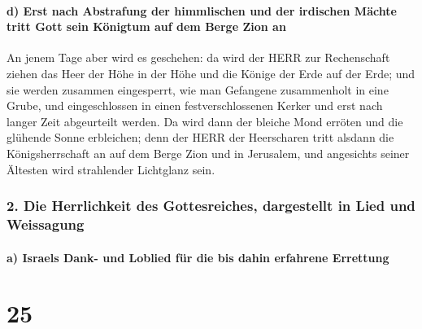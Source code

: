 \hypertarget{d-erst-nach-abstrafung-der-himmlischen-und-der-irdischen-muxe4chte-tritt-gott-sein-kuxf6nigtum-auf-dem-berge-zion-an}{%
\paragraph{d) Erst nach Abstrafung der himmlischen und der irdischen
Mächte tritt Gott sein Königtum auf dem Berge Zion
an}\label{d-erst-nach-abstrafung-der-himmlischen-und-der-irdischen-muxe4chte-tritt-gott-sein-kuxf6nigtum-auf-dem-berge-zion-an}}

An jenem Tage aber wird es geschehen: da wird der HERR
zur Rechenschaft ziehen das Heer der Höhe in der Höhe und die Könige der
Erde auf der Erde; und sie werden zusammen eingesperrt,
wie man Gefangene zusammenholt in eine Grube, und eingeschlossen in
einen festverschlossenen Kerker und erst nach langer Zeit abgeurteilt
werden. Da wird dann der bleiche Mond erröten und die
glühende Sonne erbleichen; denn der HERR der Heerscharen tritt alsdann
die Königsherrschaft an auf dem Berge Zion und in Jerusalem, und
angesichts seiner Ältesten wird strahlender Lichtglanz sein.

\hypertarget{die-herrlichkeit-des-gottesreiches-dargestellt-in-lied-und-weissagung}{%
\subsubsection{2. Die Herrlichkeit des Gottesreiches, dargestellt in
Lied und
Weissagung}\label{die-herrlichkeit-des-gottesreiches-dargestellt-in-lied-und-weissagung}}

\hypertarget{a-israels-dank--und-loblied-fuxfcr-die-bis-dahin-erfahrene-errettung}{%
\paragraph{a) Israels Dank- und Loblied für die bis dahin erfahrene
Errettung}\label{a-israels-dank--und-loblied-fuxfcr-die-bis-dahin-erfahrene-errettung}}

\hypertarget{section-24}{%
\section{25}\label{section-24}}


